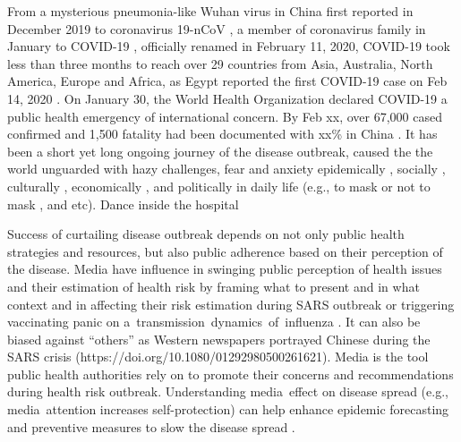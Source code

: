 
\proptitle{\fulltitle}


From a mysterious pneumonia-like Wuhan virus in China first reported in December 2019 to coronavirus 19-nCoV
, a member of coronavirus family \citep{} in January to COVID-19
, officially renamed in February 11, 2020,  COVID-19 took less than three months to reach over 29 countries from Asia, Australia, North America, Europe and Africa, as Egypt reported the first COVID-19 case on Feb 14, 2020 \citep{}.  
On January 30, the World Health Organization declared COVID-19 a public health emergency of international concern. By Feb xx, over 67,000 cased confirmed and  1,500 fatality had been documented with xx\% in China \citep{}.  
It has been a short yet long ongoing journey of the disease outbreak, caused the the world unguarded with hazy challenges, fear and anxiety epidemically \citep{}, socially \citep{} , culturally \citep{}, economically \citep{},  and politically \citep{} in daily life (e.g., to mask or not to mask 
, and etc).
Dance inside the hospital


Success of curtailing disease outbreak depends on not only public health strategies and resources, but also public adherence based on their perception of the disease.  Media have influence in swinging public perception of health issues and their estimation of health risk by framing what to present and in what context and in affecting their risk estimation during SARS outbreak \citep{BerrWalf07} or triggering vaccinating panic on a transmission dynamics of influenza \citep{TuchDube11}.  It can also be biased against “others” as Western newspapers portrayed Chinese during the SARS crisis \citep{HuanLeun06} (https://doi.org/10.1080/01292980500261621).  Media is the tool public health authorities rely on to promote their concerns and recommendations during health risk outbreak.  Understanding media effect on disease spread (e.g., media attention increases self-protection) can help enhance epidemic forecasting and preventive measures to slow the disease spread \citep{KimFast19}.  

